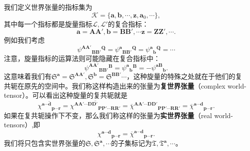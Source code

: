 我们定义世界张量的指标集为
\begin{equation*}
	\mathcal{K} =\{\boldsymbol{a} ,\boldsymbol{b} ,\cdots ,\boldsymbol{z} ,\boldsymbol{a}_{0} ,\cdots \} ,
\end{equation*}
其中每一个指标都是旋量指标$\mathcal{L} ,\mathcal{L} '$的复合指标：
\begin{equation*}
	\boldsymbol{a} =\boldsymbol{AA} ',\boldsymbol{b} =\boldsymbol{BB} ',\cdots \boldsymbol{z} =\boldsymbol{ZZ} ',\cdots .
\end{equation*}
例如我们考虑
\begin{equation*}
	\psi ^{\boldsymbol{AA} '}{}{_{\boldsymbol{BB} '}}^{\boldsymbol{Q}} =\psi ^{\boldsymbol{a}}{}{_{\boldsymbol{BB} '}}^{\boldsymbol{Q}} =\psi ^{\boldsymbol{a}}{}{_{\boldsymbol{b}}}^{\boldsymbol{Q}} =\cdots 
\end{equation*}
注意，旋量指标的运算法则可能隐藏在复合指标中：
\begin{equation*}
	\psi ^{\boldsymbol{AA} '}{}{_{\boldsymbol{BB} '}}^{\boldsymbol{B}} =\psi ^{\boldsymbol{a}}{}{_{\boldsymbol{b}}}^{\boldsymbol{B}} =-\psi ^{\boldsymbol{aB}}{}_{\boldsymbol{b}} .
\end{equation*}
这意味着我们有$\mathfrak{S}^{\boldsymbol{a}} =\mathfrak{S}^{\boldsymbol{AA} '} ,\mathfrak{S}^{\boldsymbol{b}} =\mathfrak{S}^{\boldsymbol{BB} '} \cdots $，这种旋量的特殊之处就在于他们的复共轭在原先的空间中。我们称这样构造出来的张量为\textbf{复世界张量}（complex world-tensor）。可以看出这种旋量的复共轭就是
\begin{equation*}
	\overline{\chi ^{\boldsymbol{a} \cdots \boldsymbol{d}}{}_{\boldsymbol{p} \cdots \boldsymbol{r}}} =\overline{\chi ^{\boldsymbol{AA} '\cdots \boldsymbol{DD} '}{}_{\boldsymbol{PP} '\cdots \boldsymbol{RR} '}} =\overline{\chi }^{\boldsymbol{AA} '\cdots \boldsymbol{DD} '}{}_{\boldsymbol{PP} '\cdots \boldsymbol{RR} '} =\overline{\chi }^{\boldsymbol{a} \cdots \boldsymbol{d}}{}_{\boldsymbol{p} \cdots \boldsymbol{r}} .
\end{equation*}
如果在复共轭操作下不变，那么我们称这样的张量为\textbf{实世界张量}（real world-tensors）,即
\begin{equation*}
	\chi ^{\boldsymbol{a} \cdots \boldsymbol{d}}{}_{\boldsymbol{p} \cdots \boldsymbol{r}} =\overline{\chi }^{\boldsymbol{a} \cdots \boldsymbol{d}}{}_{\boldsymbol{p} \cdots \boldsymbol{r}} .
\end{equation*}
我们将只包含实世界张量的$\mathfrak{S} ,\mathfrak{S}^{\boldsymbol{a}} ,\cdots $的子集标记为$\mathfrak{T} ,\mathfrak{T}^{\boldsymbol{a}} ,\cdots $。



